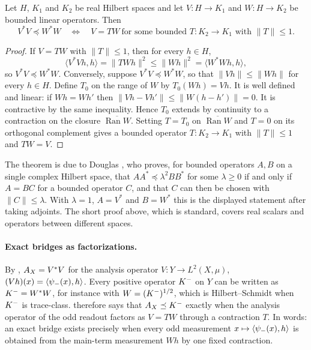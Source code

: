 \begin{theorem}
\label{thm:duality_confinement:douglas-domination}
Let \(H\), \(K_1\) and \(K_2\) be real Hilbert spaces and let
\(V:H\to K_1\) and \(W:H\to K_2\) be bounded linear operators.  Then
\[
  V^*V\preceq W^*W
  \quad\Longleftrightarrow\quad
  V=TW\ \text{for some bounded } T:K_2\to K_1 \text{ with } \|T\|\leq1.
\]
\end{theorem}

\begin{proof}
If \(V=TW\) with \(\|T\|\leq1\), then for every \(h\in H\),
\[
  \langle V^*Vh,h\rangle=\|TWh\|^2\leq\|Wh\|^2=\langle W^*Wh,h\rangle,
\]
so \(V^*V\preceq W^*W\).  Conversely, suppose \(V^*V\preceq W^*W\), so
that \(\|Vh\|\leq\|Wh\|\) for every \(h\in H\).  Define \(T_0\) on the
range of \(W\) by \(T_0(Wh)=Vh\).  It is well defined and linear: if
\(Wh=Wh'\) then \(\|Vh-Vh'\|\leq\|W(h-h')\|=0\).  It is contractive by
the same inequality.  Hence \(T_0\) extends by continuity to a
contraction on the closure \(\overline{\operatorname{Ran}W}\).  Setting
\(T=T_0\) on \(\overline{\operatorname{Ran}W}\) and \(T=0\) on its
orthogonal complement gives a bounded operator \(T:K_2\to K_1\) with
\(\|T\|\leq1\) and \(TW=V\).
\end{proof}

The theorem is due to Douglas \citep{Douglas1966}, who proves, for
bounded operators \(A,B\) on a single complex Hilbert space, that
\(AA^*\preceq\lambda^2BB^*\) for some \(\lambda\geq0\) if and only if
\(A=BC\) for a bounded operator \(C\), and that \(C\) can then be
chosen with \(\|C\|\leq\lambda\).  With \(\lambda=1\), \(A=V^*\) and
\(B=W^*\) this is the displayed statement after taking adjoints.  The
short proof above, which is standard, covers real scalars and
operators between different spaces.

\paragraph{Exact bridges as factorizations.}
By ,
\(A_{X}=V^*V\) for the analysis operator
\(V:Y\to L^2(X,\mu)\), \((Vh)(x)=\langle\psi_{-}(x),h\rangle\).  Every
positive operator \(K^{-}\) on \(Y\) can be written as
\(K^{-}=W^*W\), for instance with \(W=(K^{-})^{1/2}\), which is
Hilbert--Schmidt when \(K^{-}\) is trace-class.
 therefore says that
\(A_{X}\preceq K^{-}\) exactly when the analysis operator of the odd
readout factors as \(V=TW\) through a contraction \(T\).  In words: an
exact bridge exists precisely when every odd measurement
\(x\mapsto\langle\psi_{-}(x),h\rangle\) is obtained from the main-term
measurement \(Wh\) by one fixed contraction.
